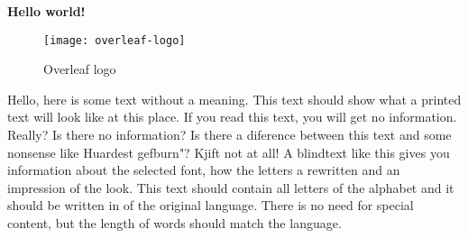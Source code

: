 \documentclass[../main.tex]{subfiles}
\begin{document}
\textbf{Hello world!}

\begin{figure}[bh]
\centering
\texttt{[image: overleaf-logo]}

\label{fig:img1}
\caption{Overleaf logo}
\end{figure}

Hello, here is some text without a meaning.
This text should show what a printed text will look like at this place.  If you read this text, you will get no information.  Really?  Is there no information?  Is there a diference between this text and some nonsense like Huardest gefburn"?  Kjift  not at all!  A blindtext like this gives you information about the selected font, how the letters a rewritten and an impression of the look.  This text should contain all letters of the alphabet and it should be written in of the original language.  There is no need for special content, but the length of words should match the language.
\end{document}
